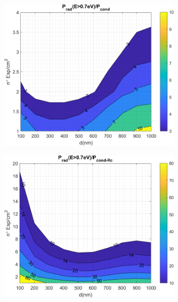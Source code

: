 \begin{figure}[H]
	\centering
	\begin{subfigure}[b]{0.49\textwidth}
		\centering
			\includegraphics[width=1.00\textwidth]{figuras/Resultados/RelacionCondRad/SS.png}
		\caption{ }
		\label{fig:rel_SsSiO2Ge}
	\end{subfigure}
	\hfill
	\begin{subfigure}[b]{0.49\textwidth}
		\centering
			\includegraphics[width=1.00\textwidth]{figuras/Resultados/RelacionCondRad/SS_Rc_empirico.png}
		\caption{ }

\end{subfigure}
\end{figure}
